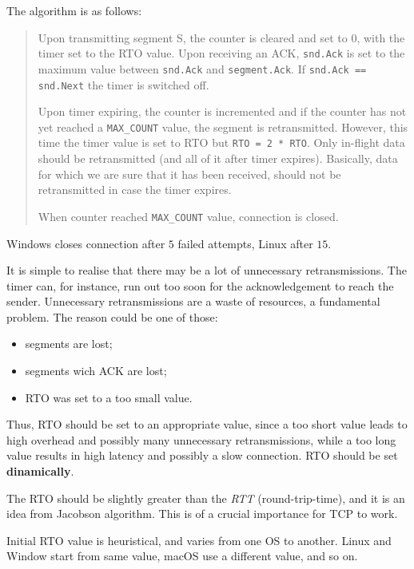 \documentclass[a4paper, 12pt]{report}
\begin{document}
The algorithm is as follows:

\begin{quote}
Upon transmitting segment S, the counter is cleared and set to $0$, with the
timer set to the RTO value. Upon receiving an ACK, \texttt{snd.Ack} is set to
the maximum value between \texttt{snd.Ack} and \texttt{segment.Ack}. If
\texttt{snd.Ack == snd.Next} the timer is switched off.

Upon timer expiring, the counter is incremented and if the counter has not yet
reached a \texttt{MAX\_COUNT} value, the segment is retransmitted. However, this
time the timer value is set to RTO but \texttt{RTO = 2 * RTO}. Only in-flight data
should be retransmitted (and all of it after timer expires). Basically, data
for which we are sure that it has been received, should not be retransmitted in
case the timer expires.

When counter reached \texttt{MAX\_COUNT} value, connection is closed.
\end{quote}

Windows closes connection after $5$ failed attempts, Linux after $15$.

It is simple to realise that there may be a lot of unnecessary retransmissions.
The timer can, for instance, run out too soon for the acknowledgement to reach
the sender. Unnecessary retransmissions are a waste of resources, a fundamental
problem. The reason could be one of those:

\begin{itemize}
	\item segments are lost;
	\item segments wich ACK are lost;
	\item RTO was set to a too small value.
\end{itemize}

Thus, RTO should be set to an appropriate value, since a too short value leads
to high overhead and possibly many unnecessary retransmissions, while a too
long value results in high latency and possibly a slow connection. RTO should
be set \textbf{dinamically}.

The RTO should be slightly greater than the \emph{RTT} (round-trip-time), and
it is an idea from Jacobson algorithm. This is of a crucial importance for TCP
to work.

Initial RTO value is heuristical, and varies from one OS to another. Linux and
Window start from same value, macOS use a different value, and so on.
\end{document}

